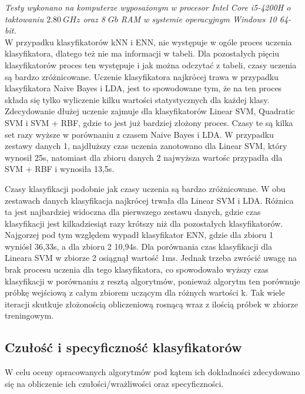 \documentclass[[10pt,a4paper]{article}
\begin{document}
\emph{Testy wykonano na komputerze wyposażonym w procesor Intel Core i5-4200H o taktowaniu $2.80 \: GHz$ oraz 8 $Gb$ RAM w systemie operacyjnym Windows 10 64-bit. }\\

W przypadku klasyfikatorów kNN i ENN, nie występuje w ogóle proces uczenia klasyfikatora, dlatego też nie ma informacji w tabeli. Dla pozostałych pięciu klasyfikatorów proces ten występuje i jak można odczytać z tabeli, czasy uczenia są bardzo zróżnicowane. Uczenie klasyfikatora najkrócej trawa w przypadku klasyfikatora Naive Bayes i LDA, jest to spowodowane tym, że na ten proces składa się tylko wyliczenie kilku wartości statystycznych dla każdej klasy. Zdecydowanie dłużej uczenie zajmuje dla klasyfikatorów Linear SVM, Quadratic SVM i SVM + RBF, gdzie to jest już bardziej złożony proces. Czasy te są kilka set razy wyższe w porównaniu z czasem Naive Bayes i LDA. W przypadku zestawy danych 1, najdłuższy czas uczenia zanotowano dla Linear SVM, który wynosił 25s, natomiast dla zbioru danych 2 najwyższa wartośc przypadła dla SVM + RBF i wynosiła 13,5s. 

Czasy klasyfikacji podobnie jak czasy uczenia są bardzo zróżnicowane. W obu zestawach danych klasyfikacja najkrócej trwała dla Linear SVM i LDA. Różnica ta jest najbardziej widoczna dla pierwszego zestawu danych, gdzie czas klasyfikacji jest kilkadziesiąt razy krótszy niż dla pozostałych klasyfikatorów. Najgorzej pod tym względem wypadł klasyfikator ENN, gdzie dla zbioru 1 wyniósł 36,33s, a dla zbioru 2 10,94s. Dla porównania czas klasyfikacji dla Lineara SVM w zbiorze 2 osiągnął wartość 1ms. Jednak trzeba zwrócić uwagę na brak procesu uczenia dla tego klasyfikatora, co spowodowało wyższy czas klasyfikacji w porównaniu z resztą algorytmów, ponieważ algorytm ten porównuje próbkę wejściową z całym zbiorem uczącym dla różnych wartości k. Tak wiele iteracji skutkuje złożonością obliczeniową rosnącą wraz z ilością próbek w zbiorze treningowym. 

\subsection{Czułość i specyficzność klasyfikatorów}

W celu oceny opracowanych algorytmów pod kątem ich dokładności zdecydowano się na obliczenie ich czułości/wrażliwości oraz specyficzności.\\
\end{document}
